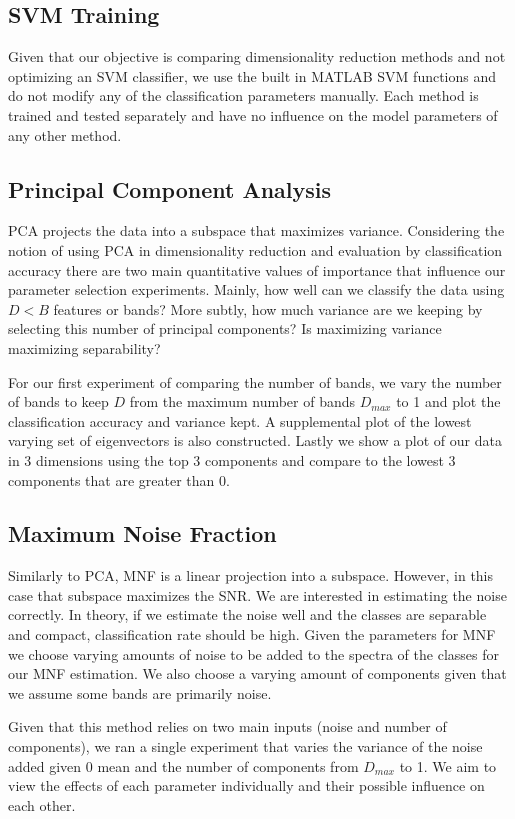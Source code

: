 \documentclass[conference,onecolumn]{IEEEtran}
\begin{document}
\subsection{SVM Training}
Given that our objective is comparing dimensionality reduction methods and not optimizing an SVM classifier, we use the built in MATLAB SVM functions and do not modify any of the classification parameters manually. Each method is trained and tested separately and have no influence on the model parameters of any other method. 


\subsection{Principal Component Analysis}
PCA projects the data into a subspace that maximizes variance. Considering the notion of using PCA in dimensionality reduction and evaluation by classification accuracy there are two main quantitative values of importance that influence our parameter selection experiments. Mainly, how well can we classify the data using $D<B$ features or bands? More subtly, how much variance are we keeping by selecting this number of principal components? Is maximizing variance maximizing separability?

For our first experiment of comparing the number of bands, we vary the number of bands to keep $D$ from the maximum number of bands $D_{max}$ to 1 and plot the classification accuracy and variance kept. A supplemental plot of the lowest varying set of eigenvectors is also constructed. Lastly we show a plot of our data in 3 dimensions using the top 3 components and compare to the lowest 3 components that are greater than 0. 

\subsection{Maximum Noise Fraction}
Similarly to PCA, MNF is a linear projection into a subspace. However, in this case that subspace maximizes the SNR. We are interested in estimating the noise correctly. In theory, if we estimate the noise well and the classes are separable and compact, classification rate should be high. Given the parameters for MNF we choose varying amounts of noise to be added to the spectra of the classes for our MNF estimation. We also choose a varying amount of components given that we assume some bands are primarily noise. 

Given that this method relies on two main inputs (noise and number of components), we ran a single experiment that varies the variance of the noise added given 0 mean and the number of components from $D_{max}$ to 1. We aim to view the effects of each parameter individually and their possible influence on each other.
\end{document}
